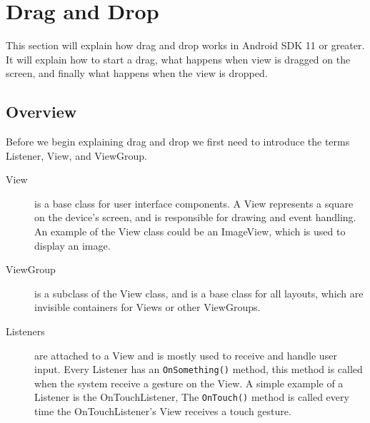 \section{Drag and Drop}
\label{sec:androiddraganddrop}
This section will explain how drag and drop works in Android SDK 11 or greater\citep{androiddraganddropguide}. It will explain how to start a drag, what happens when view is dragged on the screen, and finally what happens when the view is dropped.

\subsection*{Overview}

Before we begin explaining drag and drop we first need to introduce the terms Listener, View, and ViewGroup.
\begin{description}
\item[View] is a base class for user interface components. A View represents a square on the device's screen, and is responsible for drawing and event handling. An example of the View class could be an ImageView, which is used to display an image.

\item[ViewGroup] is a subclass of the View class, and is a base class for all layouts, which are invisible containers for Views or other ViewGroups.

\item[Listeners] are attached to a View and is mostly used to receive and handle user input. Every Listener has an  \lstinline|OnSomething()| method, this method is called when the system receive a gesture on the View. A simple example of a Listener is the OnTouchListener, The \lstinline|OnTouch()| method is called every time the OnTouchListener's View receives a touch gesture.
\end{description}

